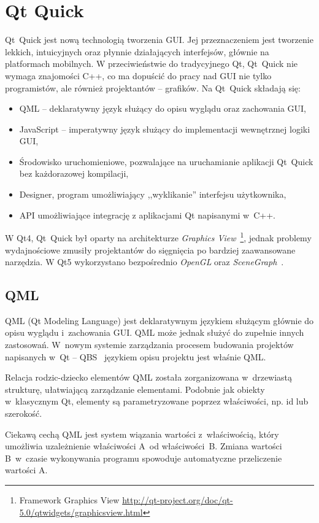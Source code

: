\section{Qt Quick}
Qt~Quick jest nową technologią tworzenia GUI. Jej przeznaczeniem jest tworzenie lekkich, intuicyjnych oraz płynnie działających interfejsów, głównie na platformach mobilnych. W przeciwieństwie do tradycyjnego Qt, Qt~Quick nie wymaga znajomości C++, co ma dopuścić do pracy nad GUI nie tylko programistów, ale również projektantów -- grafików.
Na Qt~Quick składają się:
\begin{itemize}
\item QML -- deklaratywny język służący do opisu wyglądu oraz zachowania GUI,
\item JavaScript -- imperatywny język służący do implementacji wewnętrznej logiki GUI,
\item Środowisko uruchomieniowe, pozwalające na uruchamianie aplikacji Qt~Quick bez każdorazowej kompilacji,
\item Designer, program umożliwiający ,,wyklikanie'' interfejsu użytkownika,
\item API umożliwiające integrację z aplikacjami Qt napisanymi w~C++.
\end{itemize}

W Qt4, Qt~Quick był oparty na architekturze \textit{Graphics View}~\footnote{Framework Graphics View  \url{http://qt-project.org/doc/qt-5.0/qtwidgets/graphicsview.html}}, jednak problemy wydajnościowe zmusiły projektantów do sięgnięcia po bardziej zaawansowane narzędzia. W Qt5 wykorzystano bezpośrednio \textit{OpenGL} oraz \textit{SceneGraph}~\cite{Scene:Graph}.

\subsection{QML}
QML (Qt Modeling Language) jest deklaratywnym językiem służącym głównie do opisu wyglądu i~zachowania GUI. QML może jednak służyć do zupełnie innych zastosowań. W~nowym systemie zarządzania procesem budowania projektów napisanych w~Qt -- QBS~\cite{Qt:Qbs} językiem opisu projektu jest właśnie QML.

Relacja rodzic-dziecko elementów QML została zorganizowana w~drzewiastą strukturę, ułatwiającą zarządzanie elementami. Podobnie jak obiekty w~klasycznym Qt, elementy są parametryzowane poprzez  właściwości, np. id lub szerokość. 

Ciekawą cechą QML jest system wiązania wartości z~właściwością, który umożliwia uzależnienie właściwości A~od właściwości~B. Zmiana wartości B~w~czasie wykonywania programu spowoduje automatyczne przeliczenie wartości A.

